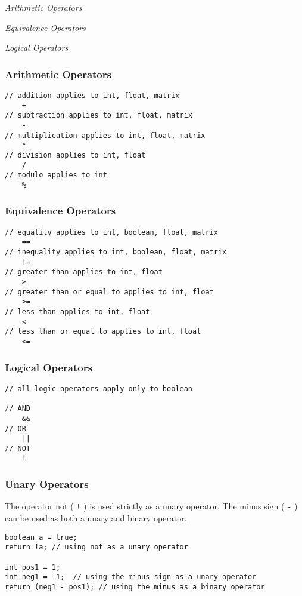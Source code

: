 \documentclass[titlepage, 12pt]{report}
\begin{document}
 \textit{Arithmetic Operators}

 \textit{Equivalence Operators}

 \textit{Logical Operators}

\subsubsection{Arithmetic Operators}
\begin{lstlisting}
// addition applies to int, float, matrix
	+
// subtraction applies to int, float, matrix
	-
// multiplication applies to int, float, matrix
	*
// division applies to int, float
	/
// modulo applies to int
	%
\end{lstlisting}
\subsubsection{Equivalence Operators}
\begin{lstlisting}
// equality applies to int, boolean, float, matrix
	==
// inequality applies to int, boolean, float, matrix
	!=
// greater than applies to int, float
	>
// greater than or equal to applies to int, float
	>=
// less than applies to int, float
	<
// less than or equal to applies to int, float
	<=
\end{lstlisting}

\subsubsection{Logical Operators}
\begin{lstlisting}
// all logic operators apply only to boolean

// AND
	&&
// OR
	||
// NOT
	!
\end{lstlisting}

\subsubsection{Unary Operators}
The operator not ( \texttt{!} ) is used strictly as a unary operator. The minus sign ( \texttt{-} ) can be used as both a unary and binary operator.
\begin{lstlisting}
boolean a = true;
return !a; // using not as a unary operator

int pos1 = 1; 
int neg1 = -1;  // using the minus sign as a unary operator
return (neg1 - pos1); // using the minus as a binary operator
\end{lstlisting}
\end{document}

